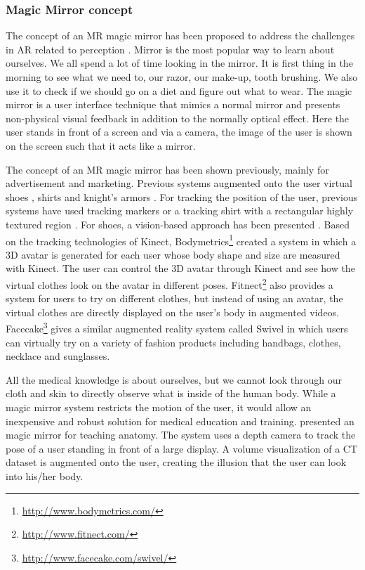 \subsubsection{Magic Mirror concept}
The concept of an MR magic mirror has been proposed to address the challenges in AR related to perception \cite{Grosjean1999}.
Mirror is the most popular way to learn about ourselves. We all spend a lot of time looking in the mirror. It is first thing in the morning to see what we need to, our razor, our make-up, tooth brushing. We also use it to check if we should go on a diet and figure out what to wear. 
The magic mirror is a user interface technique that mimics a normal mirror and presents non-physical visual feedback in addition to the normally optical effect. Here the user stands in front of a screen and via a camera, the image of the user is shown on the screen such that it acts like a mirror.

The concept of an MR magic mirror has been shown previously, mainly for advertisement and marketing. 
Previous systems augmented onto the user virtual shoes \cite{Eisert2008,Luh2013} , shirts \cite{Ehara2006} and knight's armors \cite{Fiala2007}. For tracking the position of the user, previous systems have used tracking markers or a tracking shirt with a rectangular highly textured region \cite{Hilsmann2008}. For shoes, a vision-based approach has been presented \cite{Eisert2008}.
Based on the tracking technologies of Kinect, Bodymetrics\footnote{\url{http://www.bodymetrics.com/}} created a system in which a 3D avatar is generated for each user whose body shape and size are measured with Kinect. The user can control the 3D avatar through Kinect and see how the virtual clothes look on the avatar in different poses. Fitnect\footnote{\url{http://www.fitnect.com/}} also provides a system for users to try on different clothes, but instead of using an avatar, the virtual clothes are directly displayed on the user's body in augmented videos. Facecake\footnote{\url{http://www.facecake.com/swivel/}} gives a similar augmented reality system called Swivel in which users can virtually try on a variety of fashion products including handbags, clothes, necklace and sunglasses.

All the medical knowledge is about ourselves, but we cannot look through our cloth and skin to directly observe what is inside of the human body. 
While a magic mirror system restricts the motion of the user, it would allow an inexpensive and robust solution for medical education and training. \citet{Blum2012a} presented an magic mirror for teaching anatomy. The system uses a depth camera to track the pose of a user standing in front of a large display. A volume visualization of a CT dataset is augmented onto the user, creating the illusion that the user can look into his/her body.

